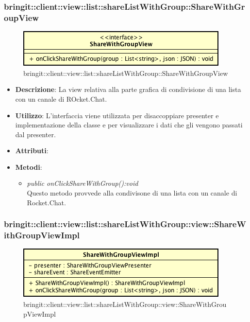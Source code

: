 \subsubsection{bringit::client::view::list::shareListWithGroup::ShareWithGroupView}

\label{bringit::client::view::list::shareListWithGroup::ShareWithGroupView}
\begin{figure}[H]
	\centering
	\includegraphics[scale=0.5]{Sezioni/SottosezioniST/img/app/ShareWithGroupView.png}
	\caption{bringit::client::view::list::shareListWithGroup::ShareWithGroupView}
\end{figure}

\begin{itemize}
\item \textbf{Descrizione}: La view relativa alla parte grafica di condivisione di una lista con un canale di ROcket.Chat.
\item \textbf{Utilizzo}: L'interfaccia viene utilizzata per disaccoppiare presenter e implementazione della classe e per visualizzare i dati che gli vengono passati dal presenter.
\item \textbf{Attributi}: 
\item \textbf{Metodi}:
	\begin{itemize}
	\item \textit{public onClickShareWithGroup():void}\\
	Questo metodo provvede alla condivisone di una lista con un canale di Rocket.Chat.
	\end{itemize}
\end{itemize} 

\subsubsection{bringit::client::view::list::shareListWithGroup::view::ShareWithGroupViewImpl}

\label{bringit::client::view::list::shareListWithGroup::view::ShareWithGroupViewImpl}
\begin{figure}[H]
	\centering
	\includegraphics[scale=0.5]{Sezioni/SottosezioniST/img/app/ShareWithGroupViewImpl.png}
	\caption{bringit::client::view::list::shareListWithGroup::view::ShareWithGroupViewImpl}
\end{figure}

